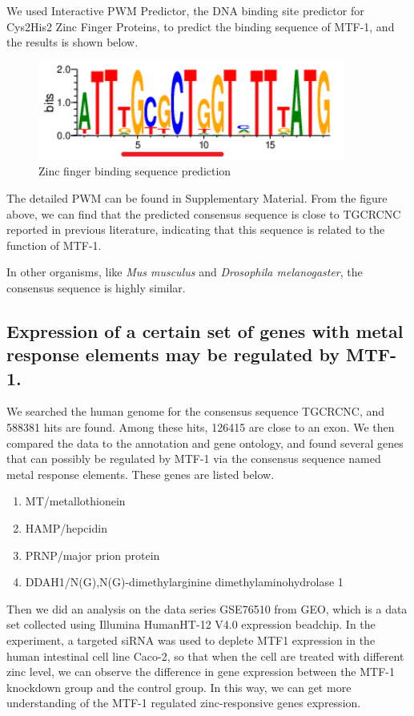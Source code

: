 We used Interactive PWM Predictor, the DNA binding site predictor for Cys2His2 Zinc Finger Proteins, to predict the binding sequence of MTF-1, and the results is shown below.

\begin{figure}[H]
    \centering
    \includegraphics[width=0.9\textwidth]{image/seq_logo.png}
    \caption{Zinc finger binding sequence prediction}
    \label{ZCP}
\end{figure}

The detailed PWM can be found in Supplementary Material. From the figure above, we can find that the predicted consensus sequence is close to TGCRCNC reported in previous literature, indicating that this sequence is related to the function of MTF-1.

In other organisms, like \textit{Mus musculus} and \textit{Drosophila melanogaster}, the consensus sequence is highly similar.

\subsection{Expression of a certain set of genes with metal response elements may be regulated by MTF-1.}

We searched the human genome for the consensus sequence TGCRCNC, and 588381 hits are found. Among these hits, 126415 are close to an exon. We then compared the data to the annotation and gene ontology, and found several genes that can possibly be regulated by MTF-1 via the consensus sequence named metal response elements. These genes are listed below.

\begin{enumerate}
    \item MT/metallothionein
    \item HAMP/hepcidin
    \item PRNP/major prion protein
    \item DDAH1/N(G),N(G)-dimethylarginine dimethylaminohydrolase 1
\end{enumerate}

Then we did an analysis on the data series GSE76510 from GEO, which is a data set collected using Illumina HumanHT-12 V4.0 expression beadchip. In the experiment, a targeted siRNA was used to deplete MTF1 expression in the human intestinal cell line Caco-2, so that when the cell are treated with different zinc level, we can observe the difference in gene expression between the MTF-1 knockdown group and the control group. In this way, we can get more understanding of the MTF-1 regulated zinc-responsive genes expression.

